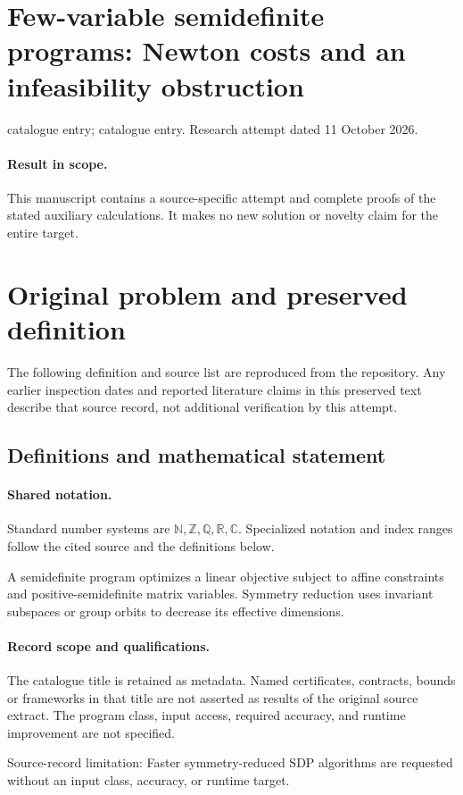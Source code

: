 \documentclass[11pt]{article}
\begin{document}
\section*{Few-variable semidefinite programs: Newton costs and an infeasibility obstruction}
\noindent catalogue entry; catalogue entry. Research attempt dated 11 October 2026.
\paragraph{Result in scope.}This manuscript contains a source-specific attempt and complete proofs of the stated auxiliary calculations. It makes no new solution or novelty claim for the entire target.
\section{Original problem and preserved definition}
The following definition and source list are reproduced from the repository. Any earlier inspection dates and reported literature claims in this preserved text describe that source record, not additional verification by this attempt.
\subsection{Definitions and mathematical statement}

\paragraph{Shared notation.}Standard number systems are $\mathbb N,\mathbb Z,\mathbb Q,\mathbb R,\mathbb C$. Specialized notation and index ranges follow the cited source and the definitions below.


A semidefinite program optimizes a linear objective subject to affine constraints and positive-semidefinite matrix variables. Symmetry reduction uses invariant subspaces or group orbits to decrease its effective dimensions.
\paragraph{Record scope and qualifications.}
The catalogue title is retained as metadata. Named certificates, contracts, bounds or frameworks in that title are not asserted as results of the original source extract.
The program class, input access, required accuracy, and runtime improvement are not specified.

Source-record limitation: Faster symmetry-reduced SDP algorithms are requested without an input class, accuracy, or runtime target.
\end{document}
